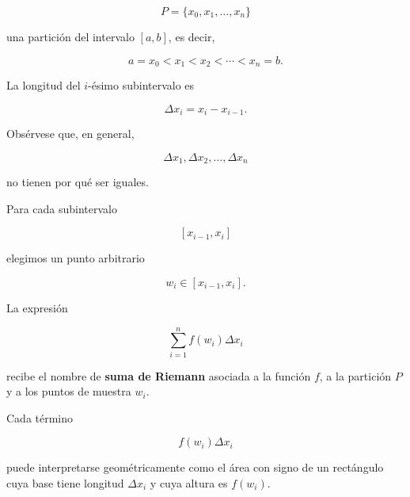 \documentclass[12pt]{article}
\begin{document}
\[
P=\{x_0,x_1,\ldots,x_n\}
\]

una partición del intervalo $[a,b]$, es decir,

\[
a=x_0<x_1<x_2<\cdots<x_n=b.
\]

La longitud del $i$-ésimo subintervalo es

\[
\Delta x_i=x_i-x_{i-1}.
\]

Obsérvese que, en general,

\[
\Delta x_1,\Delta x_2,\ldots,\Delta x_n
\]

no tienen por qué ser iguales.

Para cada subintervalo

\[
[x_{i-1},x_i]
\]

elegimos un punto arbitrario

\[
w_i\in[x_{i-1},x_i].
\]

La expresión

\[
\boxed{
\sum_{i=1}^{n}f(w_i)\Delta x_i
}
\]

recibe el nombre de \textbf{suma de Riemann} asociada a la función
$f$, a la partición $P$ y a los puntos de muestra $w_i$.

Cada término

\[
f(w_i)\Delta x_i
\]

puede interpretarse geométricamente como el área con signo de un
rectángulo cuya base tiene longitud $\Delta x_i$ y cuya altura es
$f(w_i)$.

\end{document}
